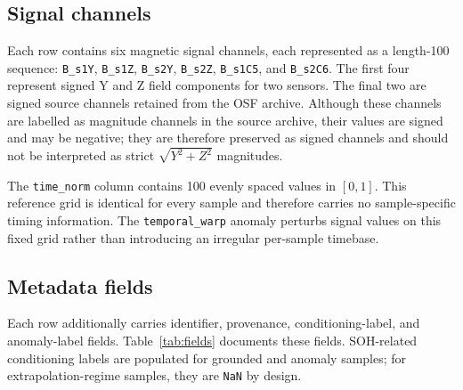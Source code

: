 \documentclass[11pt]{article}
\begin{document}
\subsection*{Signal channels}

Each row contains six magnetic signal channels, each represented as a
length-100 sequence: \texttt{B\_s1Y}, \texttt{B\_s1Z},
\texttt{B\_s2Y}, \texttt{B\_s2Z}, \texttt{B\_s1C5}, and
\texttt{B\_s2C6}. The first four represent signed Y and Z field components
for two sensors. The final two are signed source channels retained from the
OSF archive. Although these channels are labelled as magnitude channels in
the source archive, their values are signed and may be negative; they are
therefore preserved as signed channels and should not be interpreted as
strict $\sqrt{Y^2+Z^2}$ magnitudes.

The \texttt{time\_norm} column contains 100 evenly spaced values in
$[0,1]$. This reference grid is identical for every sample and therefore
carries no sample-specific timing information. The
\texttt{temporal\_warp} anomaly perturbs signal values on this fixed grid
rather than introducing an irregular per-sample timebase.

\subsection*{Metadata fields}

Each row additionally carries identifier, provenance, conditioning-label,
and anomaly-label fields. Table~\ref{tab:fields} documents these fields.
SOH-related conditioning labels are populated for grounded and anomaly
samples; for extrapolation-regime samples, they are \texttt{NaN} by design.
\end{document}
